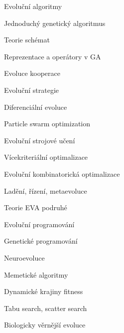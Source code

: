 
Evoluční algoritmy

Jednoduchý genetický algoritmus

Teorie schémat

Reprezentace a operátory v GA

Evoluce kooperace

Evoluční strategie

Diferenciální evoluce

Particle swarm optimization

Evoluční strojové učení

Vícekriteriální optimalizace

Evoluční kombinatorická optimalizace

Ladění, řízení, metaevoluce

Teorie EVA podruhé

Evoluční programování

Genetické programování

Neuroevoluce

Memetické algoritmy

Dynamické krajiny fitness

Tabu search, scatter search

Biologicky věrnější evoluce

